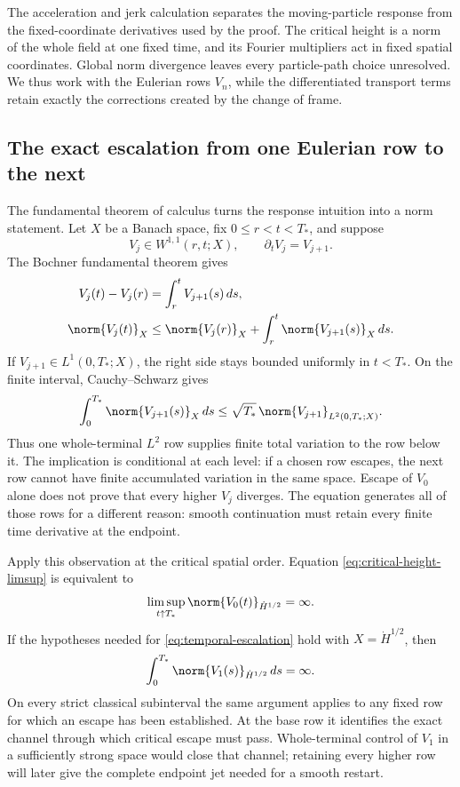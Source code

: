 The acceleration and jerk calculation separates the moving-particle response
from the fixed-coordinate derivatives used by the proof.  The critical height
is a norm of the whole field at one fixed time, and its Fourier multipliers act
in fixed spatial coordinates.  Global norm divergence leaves every
particle-path choice unresolved.  We thus work with the Eulerian rows
\(V_n\), while the differentiated transport terms retain exactly the
corrections created by the change of frame.

\subsection{The exact escalation from one Eulerian row to the next}

The fundamental theorem of calculus turns the response intuition into a norm
statement.  Let \(X\) be a Banach space, fix
\(0\le r<t<T_*\), and suppose
\begin{equation*}
 V_j\in W^{1,1}(r,t;X),
 \qquad
 \partial_tV_j=V_{j+1}.
\end{equation*}
The Bochner fundamental theorem gives
\begin{align}
 V_j(t)-V_j(r)
 &=\int_r^tV_{j+1}(s)\,ds,
 \notag\\
 \norm{V_j(t)}_X
 &\le
 \norm{V_j(r)}_X
 +\int_r^t\norm{V_{j+1}(s)}_X\,ds.
 \label{eq:temporal-escalation}
\end{align}
If \(V_{j+1}\in L^1(0,T_*;X)\), the right side stays bounded uniformly in
\(t<T_*\).  On the finite interval, Cauchy--Schwarz gives
\begin{equation*}
 \int_0^{T_*}\norm{V_{j+1}(s)}_X\,ds
 \le
 \sqrt{T_*}\,\norm{V_{j+1}}_{L^2(0,T_*;X)}.
\end{equation*}
Thus one whole-terminal \(L^2\) row supplies finite total variation to the row
below it.  The implication is conditional at each level: if a chosen row
escapes, the next row cannot have finite accumulated variation in the same
space.  Escape of \(V_0\) alone does not prove that every higher \(V_j\)
diverges.  The equation generates all of those rows for a different reason:
smooth continuation must retain every finite time derivative at the endpoint.

Apply this observation at the critical spatial order.  Equation
\eqref{eq:critical-height-limsup} is equivalent to
\begin{equation*}
 \limsup_{t\uparrow T_*}
 \norm{V_0(t)}_{\dot H^{1/2}}=\infty.
\end{equation*}
If the hypotheses needed for \eqref{eq:temporal-escalation} hold with
\(X=\dot H^{1/2}\), then
\begin{equation*}
 \int_0^{T_*}\norm{V_1(s)}_{\dot H^{1/2}}\,ds=\infty.
\end{equation*}
On every strict classical subinterval the same argument applies to any fixed
row for which an escape has been established.  At the base row it identifies
the exact channel through which critical escape must pass.  Whole-terminal
control of \(V_1\) in a sufficiently strong space would close that channel;
retaining every higher row will later give the complete endpoint jet needed
for a smooth restart.

